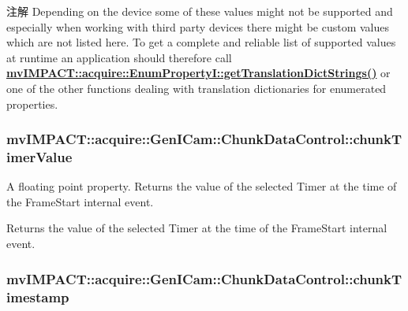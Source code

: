 \begin{DoxyNote}{注解}
Depending on the device some of these values might not be supported and especially when working with third party devices there might be custom values which are not listed here. To get a complete and reliable list of supported values at runtime an application should therefore call {\bfseries \hyperlink{classmv_i_m_p_a_c_t_1_1acquire_1_1_enum_property_i_a0ba6ccbf5ee69784d5d0b537924d26b6}{mv\+I\+M\+P\+A\+C\+T\+::acquire\+::\+Enum\+Property\+I\+::get\+Translation\+Dict\+Strings()}} or one of the other functions dealing with translation dictionaries for enumerated properties. 
\end{DoxyNote}
\hypertarget{classmv_i_m_p_a_c_t_1_1acquire_1_1_gen_i_cam_1_1_chunk_data_control_a5b634696877e47f3c773da528d1c8f90}{
\subsubsection[{chunk\+Timer\+Value}]{ mv\+I\+M\+P\+A\+C\+T\+::acquire\+::\+Gen\+I\+Cam\+::\+Chunk\+Data\+Control\+::chunk\+Timer\+Value}}\label{classmv_i_m_p_a_c_t_1_1acquire_1_1_gen_i_cam_1_1_chunk_data_control_a5b634696877e47f3c773da528d1c8f90}


A floating point property. Returns the value of the selected Timer at the time of the Frame\+Start internal event. 

Returns the value of the selected Timer at the time of the Frame\+Start internal event. \hypertarget{classmv_i_m_p_a_c_t_1_1acquire_1_1_gen_i_cam_1_1_chunk_data_control_a6524fff11f2289aecb48e49f15a28710}{
\subsubsection[{chunk\+Timestamp}]{ mv\+I\+M\+P\+A\+C\+T\+::acquire\+::\+Gen\+I\+Cam\+::\+Chunk\+Data\+Control\+::chunk\+Timestamp}}\label{classmv_i_m_p_a_c_t_1_1acquire_1_1_gen_i_cam_1_1_chunk_data_control_a6524fff11f2289aecb48e49f15a28710}


